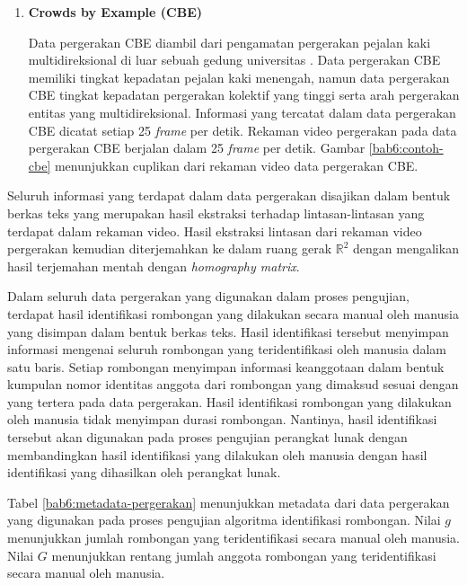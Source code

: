 \begin{enumerate}
    \item \textbf{Crowds by Example (CBE)}
    
    Data pergerakan CBE diambil dari pengamatan pergerakan pejalan kaki multidireksional di luar sebuah gedung universitas \cite{solera:06:range-reference}. Data pergerakan CBE memiliki tingkat kepadatan pejalan kaki menengah, namun data pergerakan CBE tingkat kepadatan pergerakan kolektif yang tinggi serta arah pergerakan entitas yang multidireksional. Informasi yang tercatat dalam data pergerakan CBE dicatat setiap 25 \textit{frame} per detik. Rekaman video pergerakan pada data pergerakan CBE berjalan dalam 25 \textit{frame} per detik. Gambar \ref{bab6:contoh-cbe} menunjukkan cuplikan dari rekaman video data pergerakan CBE.
    
    
\end{enumerate}

Seluruh informasi yang terdapat dalam data pergerakan disajikan dalam bentuk berkas teks yang merupakan hasil ekstraksi terhadap lintasan-lintasan yang terdapat dalam rekaman video. Hasil ekstraksi lintasan dari rekaman video pergerakan kemudian diterjemahkan ke dalam ruang gerak $\mathbb{R}^2$ dengan mengalikan hasil terjemahan mentah dengan \textit{homography matrix}.

Dalam seluruh data pergerakan yang digunakan dalam proses pengujian, terdapat hasil identifikasi rombongan yang dilakukan secara manual oleh manusia yang disimpan dalam bentuk berkas teks. Hasil identifikasi tersebut menyimpan informasi mengenai seluruh rombongan yang teridentifikasi oleh manusia dalam satu baris. Setiap rombongan menyimpan informasi keanggotaan dalam bentuk kumpulan nomor identitas anggota dari rombongan yang dimaksud sesuai dengan yang tertera pada data pergerakan. Hasil identifikasi rombongan yang dilakukan oleh manusia tidak menyimpan durasi rombongan. Nantinya, hasil identifikasi tersebut akan digunakan pada proses pengujian perangkat lunak dengan membandingkan hasil identifikasi yang dilakukan oleh manusia dengan hasil identifikasi yang dihasilkan oleh perangkat lunak.

Tabel \ref{bab6:metadata-pergerakan} menunjukkan metadata dari data pergerakan yang digunakan pada proses pengujian algoritma identifikasi rombongan. Nilai $g$ menunjukkan jumlah rombongan yang teridentifikasi secara manual oleh manusia. Nilai $G$ menunjukkan rentang jumlah anggota rombongan yang teridentifikasi secara manual oleh manusia.

